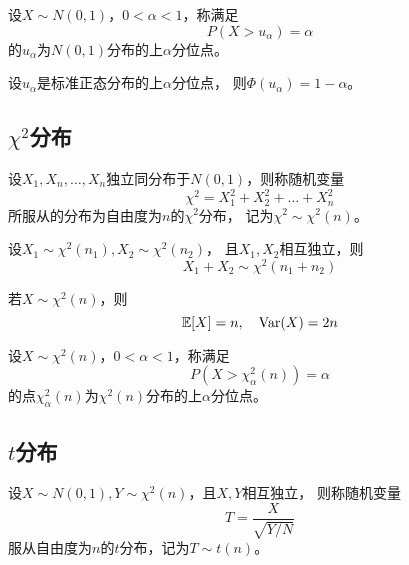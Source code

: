 \begin{definition}
  设$X\sim N(0,1)$，$0<\alpha<1$，称满足
  \begin{displaymath}
    P(X>u_\alpha) = \alpha
  \end{displaymath}
  的$u_\alpha$为$N(0,1)$分布的上$\alpha$分位点。
\end{definition}

\begin{theorem}
  设$u_\alpha$是标准正态分布的上$\alpha$分位点，
  则$\Phi(u_\alpha)=1-\alpha$。
\end{theorem}

\subsection{$\chi^2$分布}
\begin{definition}[$\chi^2$分布]
  设$X_1,X_n,\dots,X_n$独立同分布于$N(0,1)$，则称随机变量
  \begin{displaymath}
    \chi^2 = X_1^2+X_2^2+\dots+X_n^2
  \end{displaymath}
  所服从的分布为自由度为$n$的$\chi^2$分布，
  记为$\chi^2\sim\chi^2(n)$。
\end{definition}

\begin{theorem}
  设$X_1\sim\chi^2(n_1), X_2\sim\chi^2(n_2)$，
  且$X_1,X_2$相互独立，则
  \begin{displaymath}
    X_1+X_2\sim\chi^2(n_1+n_2)
  \end{displaymath}
\end{theorem}

\begin{theorem}
  若$X\sim\chi^2(n)$，则
  \begin{displaymath}
    \mathbb{E}[X] = n,\quad \textrm{Var}(X) = 2n
  \end{displaymath}
\end{theorem}

\begin{definition}
  设$X\sim\chi^2(n)$，$0<\alpha<1$，称满足
  \begin{displaymath}
  P(X>\chi_\alpha^2(n)) = \alpha
  \end{displaymath}
  的点$\chi_\alpha^2(n)$为$\chi^2(n)$分布的上$\alpha$分位点。
\end{definition}

\subsection{$t$分布}
\begin{definition}[$t$分布]
  设$X\sim N(0,1),Y\sim \chi^2(n)$，且$X,Y$相互独立，
  则称随机变量
  \begin{displaymath}
    T=\frac{X}{\sqrt{Y/N}}
  \end{displaymath}
  服从自由度为$n$的$t$分布，记为$T\sim t(n)$。
\end{definition}

